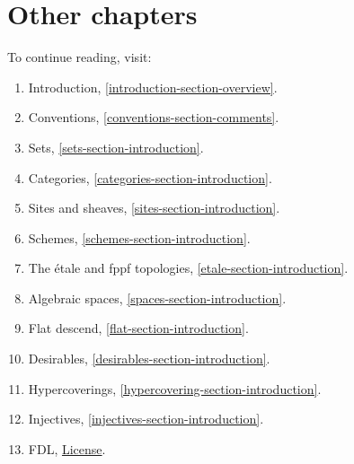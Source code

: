
















\section{Other chapters}

\noindent
To continue reading, visit:
\begin{enumerate}
\item Introduction, \autoref{introduction-section-overview}.
\item Conventions, \autoref{conventions-section-comments}.
\item Sets, \autoref{sets-section-introduction}.
\item Categories, \autoref{categories-section-introduction}.
\item Sites and sheaves, \autoref{sites-section-introduction}.
\item Schemes, \autoref{schemes-section-introduction}.
\item The \'etale and fppf topologies, \autoref{etale-section-introduction}.
\item Algebraic spaces, \autoref{spaces-section-introduction}.
\item Flat descend, \autoref{flat-section-introduction}.
\item Desirables, \autoref{desirables-section-introduction}.
\item Hypercoverings, \autoref{hypercovering-section-introduction}.
\item Injectives, \autoref{injectives-section-introduction}.
\item FDL, \hyperref[fdl-version]{License}.
\end{enumerate}

